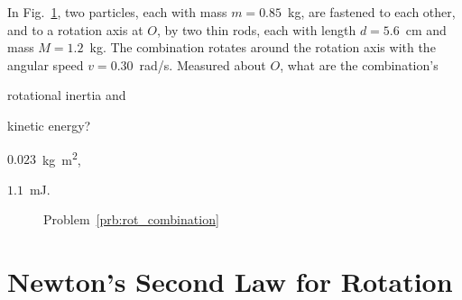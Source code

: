 \begin{problem}\label{prb:rot_combination}
	In Fig.~\ref{rot_combination}, two particles, each with mass $m = 0.85$~kg, are fastened to each other, and to a rotation axis at $O$, by two thin rods, each with length $d = 5.6$~cm and mass $M = 1.2$~kg. The combination rotates around the rotation axis with the angular speed $v = 0.30$~rad/s. Measured about $O$, what are the combination’s 
	\begin{enumerate*}[label=(\alph*)]
		\item rotational inertia and
		\item kinetic energy?
	\end{enumerate*}
	\begin{solution}
		\begin{enumerate*}[label=(\alph*)]
			\item $0.023$~\si{\kilo\gram\square\meter},
			\item $1.1$~\si{\milli\joule}.
		\end{enumerate*}
	\end{solution}
\end{problem}

\begin{figure}[h!]\centering
	\caption{Problem~\ref{prb:rot_combination}}
	\label{rot_combination}
\end{figure}

\section{Newton's Second Law for Rotation}

